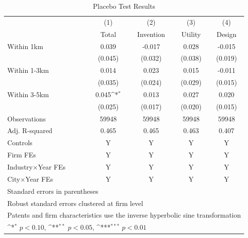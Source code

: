 \begin{table}[!htbp]\centering
\def\sym#1{\ifmmode^{#1}\else\(^{#1}\)\fi}
\caption{Placebo Test Results}
\label{tab:RBplacebo}
\begin{tabular}{l*{4}{c}}
\toprule
            &\multicolumn{1}{c}{(1)}&\multicolumn{1}{c}{(2)}&\multicolumn{1}{c}{(3)}&\multicolumn{1}{c}{(4)}\\
            &\multicolumn{1}{c}{Total}&\multicolumn{1}{c}{Invention}&\multicolumn{1}{c}{Utility}&\multicolumn{1}{c}{Design}\\
\midrule
Within 1km  &       0.039         &      -0.017         &       0.028         &      -0.015         \\
            &     (0.045)         &     (0.032)         &     (0.038)         &     (0.019)         \\
\addlinespace
Within 1-3km&       0.014         &       0.023         &       0.015         &      -0.011         \\
            &     (0.035)         &     (0.024)         &     (0.029)         &     (0.015)         \\
\addlinespace
Within 3-5km&       0.045\sym{*}  &       0.013         &       0.027         &       0.020         \\
            &     (0.025)         &     (0.017)         &     (0.020)         &     (0.015)         \\
\midrule
Observations&       59948         &       59948         &       59948         &       59948         \\
Adj. R-squared&       0.465         &       0.465         &       0.463         &       0.407         \\
Controls    &           Y         &           Y         &           Y         &           Y         \\
Firm FEs    &           Y         &           Y         &           Y         &           Y         \\
Industry$\times$Year FEs&           Y         &           Y         &           Y         &           Y         \\
City$\times$Year FEs&           Y         &           Y         &           Y         &           Y         \\
\bottomrule
\multicolumn{5}{l}{\footnotesize Standard errors in parentheses}\\
\multicolumn{5}{l}{\footnotesize Robust standard errors clustered at firm level}\\
\multicolumn{5}{l}{\footnotesize Patents and firm characteristics use the inverse hyperbolic sine transformation}\\
\multicolumn{5}{l}{\footnotesize \sym{*} \(p<0.10\), \sym{**} \(p<0.05\), \sym{***} \(p<0.01\)}\\
\end{tabular}
\end{table}